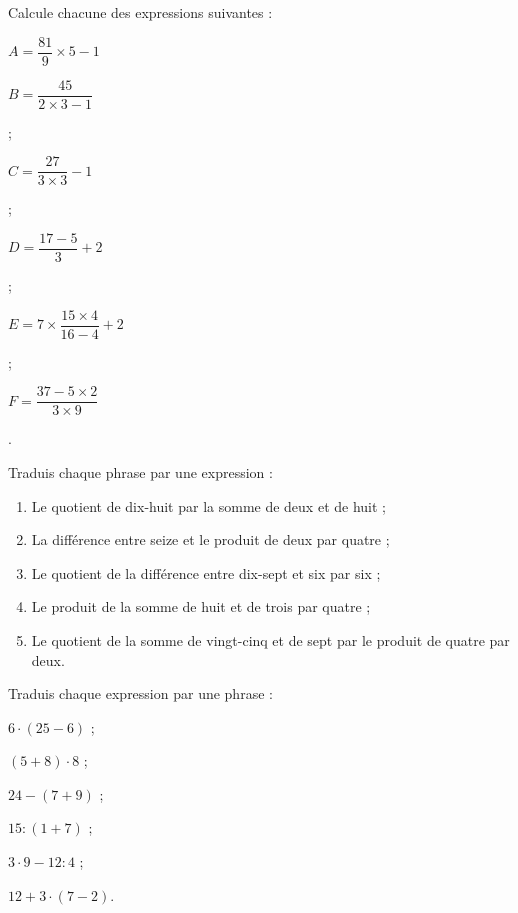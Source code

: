 \begin{exercice}
Calcule chacune des expressions suivantes :

$A = \dfrac{81}{9} \times 5 - 1$ \dotfill

\dotfill

$B = \dfrac{45}{2 \times 3 - 1}$ \dotfill

\dotfill

\dotfill ;

$C = \dfrac{27}{3 \times 3} - 1$ \dotfill

\dotfill

\dotfill ;

$D = \dfrac{17 - 5}{3} + 2$ \dotfill 

\dotfill

\dotfill ;

$E = 7 \times \dfrac{15 \times 4}{16 - 4} + 2$ \dotfill 

\dotfill

\dotfill ;

$F = \dfrac{37 - 5 \times 2}{3 \times 9}$ \dotfill

\dotfill

\dotfill.
\end{exercice}




\begin{exercice}
Traduis chaque phrase par une expression :
\begin{enumerate}
 \item Le quotient de dix-huit par la somme de deux et de huit ;
 \item La différence entre seize et le produit de deux par quatre ;
 \item Le quotient de la différence entre dix-sept et six par six ;
 \item Le produit de la somme de huit et de trois par quatre ;
 \item Le quotient de la somme de vingt-cinq et de sept par le produit de quatre par deux.
 \end{enumerate}
\end{exercice}


\begin{exercice}
Traduis chaque expression par une phrase :
\begin{colenumerate}{2}
 \item $6 \cdot (25 - 6)$ ;
 \item $(5 + 8) \cdot 8$ ;
 \item $24 - (7 + 9)$ ;
 \item $15 : (1 + 7)$ ;
 \item $3 \cdot 9 - 12 : 4$ ;
 \item $12 + 3 \cdot (7 - 2)$.
 \end{colenumerate}
\end{exercice} 


